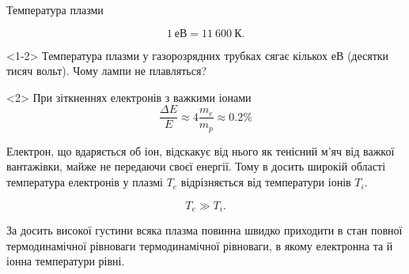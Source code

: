 \documentclass[]{beamer}
\begin{document}
\begin{frame}{Температура плазми}{}
\begin{block}{}
    \begin{equation*}
    1\ \text{еВ} = 11\ 600\ \text{К}.
\end{equation*}
\end{block}
       \begin{alertblock}{}<1-2>
          Температура плазми у газорозрядних трубках сягає кількох еВ (десятки тисяч вольт). Чому лампи не плавляться?
       \end{alertblock}
       \begin{onlyenv}<2>
       При зіткненнях електронів з важкими іонами
       \begin{equation*}
           \frac{\Delta E}{E} \approx 4 \frac{m_e}{m_p} \approx 0.2 \%
       \end{equation*}

       \end{onlyenv}
       Електрон, що вдаряється об іон, відскакує від нього як тенісний м'яч від важкої вантажівки, майже не передаючи своєї енергії. Тому в досить широкій області температура електронів у плазмі $T_e$ відрізняється від температури іонів $T_i$.

      \begin{equation*}
          T_e \gg T_i.
      \end{equation*}

      \begin{block}{}\footnotesize\justifying
      За досить високої густини всяка плазма повинна швидко приходити в стан повної термодинамічної рівноваги термодинамічної рівноваги, в якому електронна та й іонна температури рівні.
      \end{block}
\end{frame}
\end{document}

